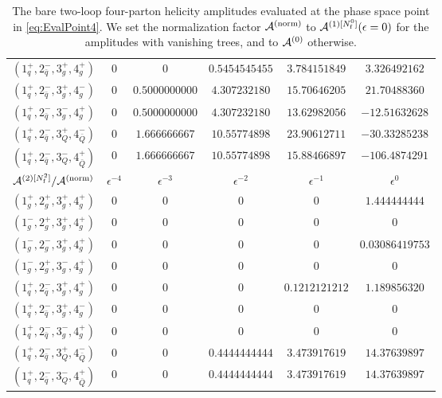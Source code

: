 \begin{table}[h]
\begin{adjustbox}{width=1\textwidth}
\begin{tabular}{cccccc}
      \midrule
      $( 1_q^+, 2_{\bar q}^-, 3_g^+, 4_g^+ )$ & 0 & 0 & $0.5454545455$ & $3.784151849$ & $3.326492162$ \\
      $( 1_q^+, 2_{\bar q}^-, 3_g^+, 4_g^- )$ & 0 & $0.5000000000$ & $4.307232180$ & $15.70646205$ & $21.70488360$ \\
      $( 1_q^+, 2_{\bar q}^-, 3_g^-, 4_g^+ )$ & 0 & $0.5000000000$ & $4.307232180$ & $13.62982056$ & $-12.51632628$ \\
      \midrule
      $( 1_q^+, 2_{\bar q}^-, 3_Q^+, 4_{\bar Q}^- )$ & 0 & $1.666666667$ & $10.55774898$ & $23.90612711$ & $-30.33285238$ \\
      $( 1_q^+, 2_{\bar q}^-, 3_Q^-, 4_{\bar Q}^+ )$ & 0 & $1.666666667$ & $10.55774898$ & $15.88466897$ & $-106.4874291$ \\
      \toprule
      $\mathcal{A}^{(2)[N_\mathrm{f}^2]}/\mathcal{A}^\mathrm{(norm)}$	  &   $\epsilon^{-4}$   &   $\epsilon^{-3}$   &   $\epsilon^{-2}$   &   $\epsilon^{-1}$   &   $\epsilon^{0}$   \\
      \midrule
      $( 1_g^+, 2_g^+, 3_g^+, 4_g^+ )$ & 0 & 0 & 0 & 0 & $1.444444444$ \\
      $( 1_g^-, 2_g^+, 3_g^+, 4_g^+ )$ & 0 & 0 & 0 & 0 & $0$ \\
      $( 1_g^-, 2_g^-, 3_g^+, 4_g^+ )$ & 0 & 0 & 0 & 0 & $0.03086419753$ \\
      $( 1_g^-, 2_g^+, 3_g^-, 4_g^+ )$ & 0 & 0 & 0 & 0 & $0$ \\
      \midrule
      $( 1_q^+, 2_{\bar q}^-, 3_g^+, 4_g^+ )$ & 0 & 0 & 0 & $0.1212121212$ & $1.189856320$ \\
      $( 1_q^+, 2_{\bar q}^-, 3_g^+, 4_g^- )$ & 0 & 0 & 0 & 0 & $0$ \\
      $( 1_q^+, 2_{\bar q}^-, 3_g^-, 4_g^+ )$ & 0 & 0 & 0 & 0 & $0$ \\
      \midrule
      $( 1_q^+, 2_{\bar q}^-, 3_Q^+, 4_{\bar Q}^- )$ & 0 & 0 & $0.4444444444$ & $3.473917619$ & $14.37639897$ \\
      $( 1_q^+, 2_{\bar q}^-, 3_Q^-, 4_{\bar Q}^+ )$ & 0 & 0 & $0.4444444444$ & $3.473917619$ & $14.37639897$ \\
      \bottomrule
    \end{tabular}
  \end{adjustbox}
  \caption{The bare two-loop four-parton helicity amplitudes evaluated
    at the phase space point in \cref{eq:EvalPoint4}. We set the
    normalization factor $\mathcal{A}^\mathrm{(norm)}$ to $\mathcal{A}^{(1)[N_\mathrm{f}^0]}(\epsilon=0)$ for the
    amplitudes with vanishing trees, and to $\mathcal{A}^{(0)}$ otherwise.} 
  \label{tab:results4parton}
\end{table}


